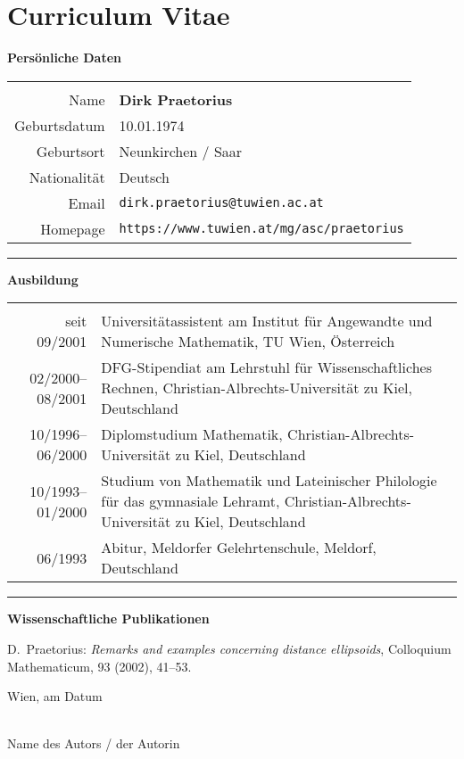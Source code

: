 \chapter*{Curriculum Vitae}
\thispagestyle{empty}

\noindent
{\bfseries\Large Persönliche Daten}

\begin{tabular}{rp{}}
\hspace*{.2\textwidth}&\\
Name & {\bfseries Dirk Praetorius} \\
Geburtsdatum & 10.01.1974 \\
Geburtsort & Neunkirchen / Saar \\
Nationalität & Deutsch \\
Email & \verb$dirk.praetorius@tuwien.ac.at$ \\
Homepage & \verb$https://www.tuwien.at/mg/asc/praetorius$ \\
\end{tabular}

\bigskip
\bigskip
\hrule
\bigskip
\bigskip

\noindent
{\bfseries\Large Ausbildung}

\begin{tabular}{rp{}}
\hspace*{.2\textwidth}&\\
seit 09/2001 & Universitätassistent am Institut für Angewandte und Numerische Mathematik, TU Wien, Österreich \\
02/2000--08/2001 & DFG-Stipendiat am Lehrstuhl für Wissenschaftliches Rechnen, Christian-Albrechts-Universität zu Kiel, Deutschland \\ 
10/1996--06/2000 & Diplomstudium Mathematik, Christian-Albrechts-Universität zu Kiel, Deutschland \\
10/1993--01/2000 & Studium von Mathematik und Lateinischer Philologie für das gymnasiale Lehramt, Christian-Albrechts-Universität zu Kiel, Deutschland \\
06/1993 & Abitur, Meldorfer Gelehrtenschule, Meldorf, Deutschland \\
\end{tabular}

\bigskip
\bigskip
\hrule
\bigskip
\bigskip

\noindent
{\bfseries\Large Wissenschaftliche Publikationen}

\bigskip

\noindent
D.~Praetorius: \emph{Remarks and examples concerning distance ellipsoids}, Colloquium Mathematicum, 93 (2002), 41--53.

\vspace*{3cm}

\noindent
Wien, am {\color{change}Datum} %
%
\hfill 
%
\begin{minipage}[t]{5cm}
\centering
\underline{\hspace*{5cm}}\\
\small\color{change}Name des Autors / der Autorin
\end{minipage}